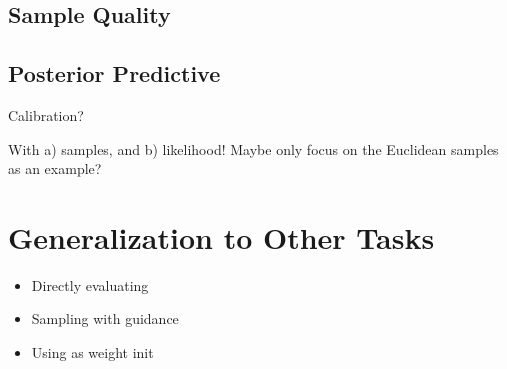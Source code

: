 \subsection{Sample Quality}

\subsection{Posterior Predictive}

Calibration? 

With a) samples, and b) likelihood! Maybe only focus on the Euclidean samples as an example? 

\section{Generalization to Other Tasks} \label{sec:task_generalization}

\begin{itemize}
    \item Directly evaluating
    \item Sampling with guidance
    \item Using as weight init 
\end{itemize}

